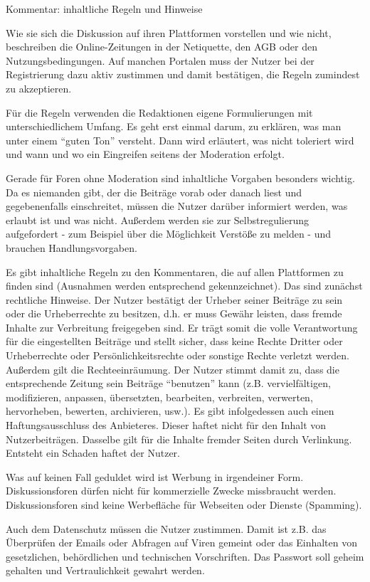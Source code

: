 Kommentar: inhaltliche Regeln und Hinweise

Wie sie sich die Diskussion auf ihren Plattformen vorstellen und wie nicht, beschreiben die Online-Zeitungen in der Netiquette, den AGB oder den Nutzungsbedingungen. Auf manchen Portalen muss der Nutzer bei der Registrierung dazu aktiv zustimmen und damit bestätigen, die Regeln zumindest zu akzeptieren. 

Für die Regeln verwenden die Redaktionen eigene Formulierungen mit unterschiedlichem Umfang. Es geht erst einmal darum, zu erklären, was man unter einem ``guten Ton'' versteht. Dann wird erläutert, was nicht toleriert wird und wann und wo ein Eingreifen seitens der Moderation erfolgt. 

Gerade für Foren ohne Moderation sind inhaltliche Vorgaben besonders wichtig. Da es niemanden gibt, der die Beiträge vorab oder danach liest und gegebenenfalls einschreitet, müssen die Nutzer darüber informiert werden, was erlaubt ist und was nicht. Außerdem werden sie zur Selbstregulierung aufgefordert - zum Beispiel über die Möglichkeit Verstöße zu melden - und brauchen Handlungsvorgaben.

Es gibt inhaltliche Regeln zu den Kommentaren, die auf allen Plattformen zu finden sind (Ausnahmen werden entsprechend gekennzeichnet). 
Das sind zunächst rechtliche Hinweise. Der Nutzer bestätigt der Urheber seiner Beiträge zu sein oder die Urheberrechte zu besitzen, d.h. er muss Gewähr leisten, dass fremde Inhalte zur Verbreitung freigegeben sind. Er trägt somit die volle Verantwortung für die eingestellten Beiträge und stellt sicher, dass keine Rechte Dritter oder Urheberrechte oder Persönlichkeitsrechte oder sonstige Rechte verletzt werden. Außerdem gilt die Rechteeinräumung. Der Nutzer stimmt damit zu, dass die entsprechende Zeitung sein Beiträge ``benutzen'' kann (z.B. vervielfältigen, modifizieren, anpassen, übersetzten, bearbeiten, verbreiten, verwerten, hervorheben, bewerten, archivieren, usw.). 
Es gibt infolgedessen auch einen Haftungsausschluss des Anbieteres. Dieser haftet nicht für den Inhalt von Nutzerbeiträgen. Dasselbe gilt für die Inhalte fremder Seiten durch Verlinkung. Entsteht ein Schaden haftet der Nutzer. 

Was auf keinen Fall geduldet wird ist Werbung in irgendeiner Form. Diskussionsforen dürfen nicht für kommerzielle Zwecke missbraucht werden. Diskussionsforen sind keine Werbefläche für Webseiten oder Dienste (Spamming). 

Auch dem Datenschutz müssen die Nutzer zustimmen. Damit ist z.B. das Überprüfen der Emails oder Abfragen auf Viren gemeint oder das Einhalten von gesetzlichen, behördlichen und technischen Vorschriften. Das Passwort soll geheim gehalten und Vertraulichkeit gewahrt werden. 

